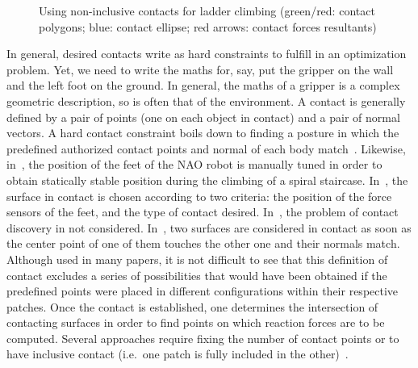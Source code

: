 \begin{figure}
\centering
  \centering
  \setlength\fboxsep{0pt}
  \setlength\fboxrule{1pt}
\caption{Using non-inclusive contacts for ladder climbing (green/red: contact polygons; blue: contact ellipse; red arrows: contact forces resultants)}
\label{fig:hrp2_jrl_complete}
\end{figure}

In general, desired contacts write as hard constraints to fulfill in an optimization problem.
Yet, we need to write the maths for, say, put the gripper on the wall and the left foot on the ground.
In general, the maths of a gripper is a complex geometric description, so is often that of the environment.
A contact is generally defined by a pair of points (one on each object in contact) and a pair of normal vectors.
A hard contact constraint boils down to finding a posture in which the predefined authorized contact points and normal of each body match~\cite{zhang:TePRA:2013}\cite{hauser:IJRR:2008}.
Likewise, in~\cite{osswald:iros:2011}, the position of the feet of the NAO robot is manually tuned in order to obtain statically stable position during the climbing of a spiral staircase.
In~\cite{Chestnutt:2009:BNR:1733023.1733314}, the surface in contact is chosen according to two criteria: the position of the force sensors of the feet, and the type of contact desired.
In~\cite{sentis:itro:2010}, the problem of contact discovery in not considered.
In~\cite{mordatch:acm:2012}, two surfaces are considered in contact as soon as the center point of one of them touches the other one and their normals match.
Although used in many papers, it is not difficult to see that this definition of contact excludes a series of possibilities that would have been obtained if the predefined points were placed in different configurations within their respective patches.
Once the contact is established, one determines the intersection of contacting surfaces in order to find points on which reaction forces are to be computed.
Several approaches require fixing the number of contact points or to have inclusive contact (i.e.\ one patch is fully included in the other)~\cite{bouyarmane:ar:2012}.

